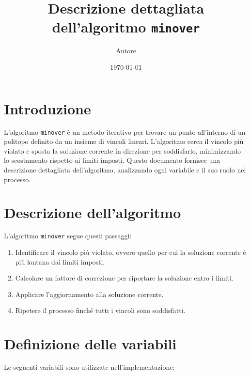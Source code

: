 \documentclass[a4paper,12pt]{article}
\title{Descrizione dettagliata dell'algoritmo \texttt{minover}}
\author{Autore}
\date{\today}
\begin{document}
\maketitle

\section{Introduzione}
L'algoritmo \texttt{minover} \`e un metodo iterativo per trovare un punto all'interno di un politopo definito da un insieme di vincoli lineari. L'algoritmo cerca il vincolo pi\`u violato e sposta la soluzione corrente in direzione per soddisfarlo, minimizzando lo scostamento rispetto ai limiti imposti.\newline
Questo documento fornisce una descrizione dettagliata dell'algoritmo, analizzando ogni variabile e il suo ruolo nel processo.

\section{Descrizione dell'algoritmo}
L'algoritmo \texttt{minover} segue questi passaggi:

\begin{enumerate}
    \item Identificare il vincolo pi\`u violato, ovvero quello per cui la soluzione corrente \`e pi\`u lontana dai limiti imposti.
    \item Calcolare un fattore di correzione per riportare la soluzione entro i limiti.
    \item Applicare l'aggiornamento alla soluzione corrente.
    \item Ripetere il processo finch\'e tutti i vincoli sono soddisfatti.
\end{enumerate}

\section{Definizione delle variabili}
Le seguenti variabili sono utilizzate nell'implementazione:
\end{document}
